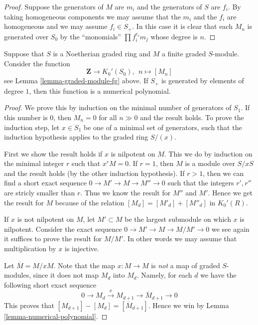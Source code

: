 \begin{proof}
Suppose the generators of $M$ are $m_i$ and the generators
of $S$ are $f_i$. By taking homogeneous components we may
assume that the $m_i$ and the $f_i$ are homogeneous
and we may assume $f_i \in S_{+}$. In this case it is
clear that each $M_n$ is generated over $S_0$
by the ``monomials'' $\prod f_i^{e_i} m_j$ whose
degree is $n$.
\end{proof}

\begin{proposition}
\label{proposition-graded-hilbert-polynomial}
Suppose that $S$ is a Noetherian graded ring
and $M$ a finite graded $S$-module. Consider the
function
$$
\mathbf{Z} \longrightarrow K_0'(S_0), \ \ 
n \longmapsto [M_n]
$$
see Lemma \ref{lemma-graded-module-fg} above.
If $S_{+}$ is generated by elements of degree $1$,
then this function is a numerical polynomial.
\end{proposition}

\begin{proof}
We prove this by induction on the minimal number of
generators of $S_1$. If this number is $0$, then
$M_n = 0$ for all $n \gg 0$ and the result holds.
To prove the induction step, let $x\in S_1$
be one of a minimal set of generators, such that
the induction hypothesis applies to the
graded ring $S/(x)$.

\medskip\noindent
First we show the result holds if $x$ is nilpotent on $M$.
This we do by induction on the minimal integer $r$ such that
$x^r M  = 0$. If $r = 1$, then $M$ is a module over $S/xS$
and the result holds (by the other induction hypothesis).
If $r > 1$, then we can find a short exact sequence
$0 \to M' \to M \to M'' \to 0$ such that the integers
$r', r''$ are stricly smaller than $r$. Thus we know
the result for $M''$ and $M'$. Hence
we get the result for $M$ because of the relation
$
[M_d]  = [M'_d] + [M''_d]
$
in $K_0'(R)$.

\medskip\noindent
If $x$ is not nilpotent on $M$, let $M' \subset M$ be
the largest submodule on which $x$ is nilpotent.
Consider the exact sequence $0 \to M' \to M \to M/M' \to 0$
we see again it suffices to prove the result for $M/M'$. In other
words we may assume that multiplication by $x$ is injective.

\medskip\noindent
Let $\overline{M} = M/xM$. Note that the map $x : M \to M$
is {\it not} a map of graded $S$-modules, since it does
not map $M_d$ into $M_d$. Namely, for each $d$ we have the
following short exact sequence
$$
0 \to M_d \xrightarrow{x} M_{d + 1} \to \overline{M}_{d + 1} \to 0
$$
This proves that $[M_{d + 1}] - [M_d] = [\overline{M}_{d + 1}]$.
Hence we win by Lemma \ref{lemma-numerical-polynomial}.
\end{proof}

